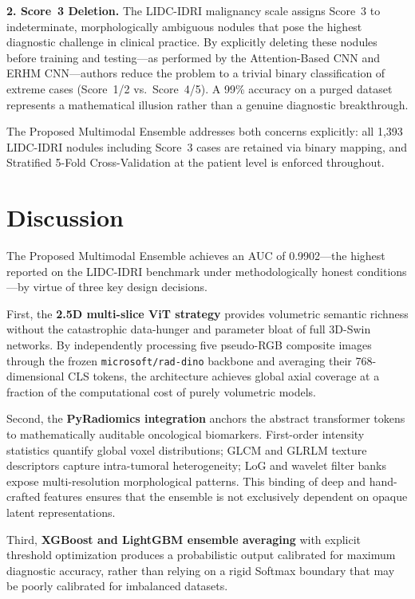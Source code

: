 \documentclass{iopjournal}
\begin{document}
\textbf{2. Score~3 Deletion.} The LIDC-IDRI malignancy scale assigns Score~3
to indeterminate, morphologically ambiguous nodules that pose the highest
diagnostic challenge in clinical practice. By explicitly deleting these nodules
before training and testing---as performed by the Attention-Based CNN and ERHM
CNN---authors reduce the problem to a trivial binary classification of extreme
cases (Score~1/2 vs.\ Score~4/5). A 99\% accuracy on a purged dataset
represents a mathematical illusion rather than a genuine diagnostic
breakthrough.

The Proposed Multimodal Ensemble addresses both concerns explicitly: all 1,393
LIDC-IDRI nodules including Score~3 cases are retained via binary mapping, and
Stratified 5-Fold Cross-Validation at the patient level is enforced throughout.

\section{Discussion}\label{sec4}

{\color{revblue}The Proposed Multimodal Ensemble achieves an AUC of 0.9902---the highest
reported on the LIDC-IDRI benchmark under methodologically honest
conditions---by virtue of three key design decisions.

First, the \textbf{2.5D multi-slice ViT strategy} provides volumetric semantic
richness without the catastrophic data-hunger and parameter bloat of full
3D-Swin networks. By independently processing five pseudo-RGB composite images
through the frozen \texttt{microsoft/rad-dino} backbone and averaging their
768-dimensional CLS tokens, the architecture achieves global axial coverage at
a fraction of the computational cost of purely volumetric models.

Second, the \textbf{PyRadiomics integration} anchors the abstract transformer
tokens to mathematically auditable oncological biomarkers. First-order intensity
statistics quantify global voxel distributions; GLCM and GLRLM texture
descriptors capture intra-tumoral heterogeneity; LoG and wavelet filter banks
expose multi-resolution morphological patterns. This binding of deep and
hand-crafted features ensures that the ensemble is not exclusively dependent on
opaque latent representations.

Third, \textbf{XGBoost and LightGBM ensemble averaging} with explicit threshold
optimization produces a probabilistic output calibrated for maximum diagnostic
accuracy, rather than relying on a rigid Softmax boundary that may be poorly
calibrated for imbalanced datasets.}
\end{document}
